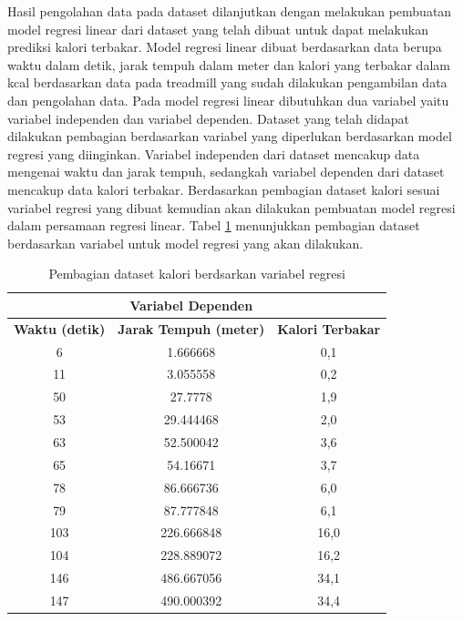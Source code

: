 Hasil pengolahan data pada dataset dilanjutkan dengan melakukan pembuatan model regresi linear dari dataset yang telah dibuat untuk dapat melakukan prediksi kalori terbakar. Model regresi linear dibuat berdasarkan data berupa waktu dalam detik, jarak tempuh dalam meter dan kalori yang terbakar dalam kcal berdasarkan data pada treadmill yang sudah dilakukan pengambilan data dan pengolahan data. Pada model regresi linear dibutuhkan dua variabel yaitu variabel independen dan variabel dependen. Dataset yang telah didapat dilakukan pembagian berdasarkan variabel yang diperlukan berdasarkan model regresi yang diinginkan. Variabel independen dari dataset mencakup data mengenai waktu dan jarak tempuh, sedangkah variabel dependen dari dataset mencakup data kalori terbakar. Berdasarkan pembagian dataset kalori sesuai variabel regresi yang dibuat kemudian akan dilakukan pembuatan model regresi dalam persamaan regresi linear. Tabel \ref{tb:VariabelPrediksiKalori} menunjukkan pembagian dataset berdasarkan variabel untuk model regresi yang akan dilakukan. 

\begin{longtable}{|c|c|c|}
  \caption{Pembagian dataset kalori berdsarkan variabel regresi}
  \label{tb:VariabelPrediksiKalori}                                   \\
  \hline
  \rowcolor[HTML]{C0C0C0}
  \multicolumn{2}{|c|}{\textbf{Variabel Independen}}  & \textbf{Variabel Dependen}  \\
  \hline
  \rowcolor[HTML]{C0C0C0}
  \textbf{Waktu (detik)} & \textbf{Jarak Tempuh (meter)} & \textbf{Kalori Terbakar} \\
  \hline
  6    & 1.666668    & 0,1     \\
  \hline
  11    & 3.055558    & 0,2     \\
  \hline
  50    & 27.7778    & 1,9     \\
  \hline
  53    & 29.444468    & 2,0     \\
  \hline
  63    & 52.500042    & 3,6     \\
  \hline
  65    & 54.16671    & 3,7     \\
  \hline
  78    & 86.666736    & 6,0     \\
  \hline
  79    & 87.777848    & 6,1     \\
  \hline
  103    & 226.666848    & 16,0     \\
  \hline
  104    & 228.889072    & 16,2     \\
  \hline
  146    & 486.667056    & 34,1     \\
  \hline
  147    & 490.000392    & 34,4     \\
  \hline
\end{longtable}

